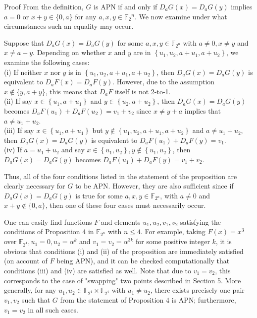 \documentclass[10pt]{article}
\begin{document}
Proof From the definition, $G$ is APN if and only if $D_{a} G(x)=D_{a} G(y)$ implies $a=0$ or $x+y \in\{0, a\}$ for any $a, x, y \in \mathbb{F}_{2}{ }^{n}$. We now examine under what circumstances such an equality may occur.

Suppose that $D_{a} G(x)=D_{a} G(y)$ for some $a, x, y \in \mathbb{F}_{2^{n}}$ with $a \neq 0, x \neq y$ and $x \neq a+y$. Depending on whether $x$ and $y$ are in $\left\{u_{1}, u_{2}, a+u_{1}, a+u_{2}\right\}$, we examine the following cases:\\
(i) If neither $x$ nor $y$ is in $\left\{u_{1}, u_{2}, a+u_{1}, a+u_{2}\right\}$, then $D_{a} G(x)=D_{a} G(y)$ is equivalent to $D_{a} F(x)=D_{a} F(y)$. However, due to the assumption $x \notin\{y, a+y\}$, this means that $D_{a} F$ itself is not 2-to-1.\\
(ii) If say $x \in\left\{u_{1}, a+u_{1}\right\}$ and $y \in\left\{u_{2}, a+u_{2}\right\}$, then $D_{a} G(x)=D_{a} G(y)$ becomes $D_{a} F\left(u_{1}\right)+D_{a} F\left(u_{2}\right)=v_{1}+v_{2}$ since $x \neq y+a$ implies that $a \neq u_{1}+u_{2}$.\\
(iii) If say $x \in\left\{u_{1}, a+u_{1}\right\}$ but $y \notin\left\{u_{1}, u_{2}, a+u_{1}, a+u_{2}\right\}$ and $a \neq u_{1}+u_{2}$, then $D_{a} G(x)=D_{a} G(y)$ is equivalent to $D_{a} F\left(u_{1}\right)+D_{a} F(y)=v_{1}$.\\
(iv) If $a=u_{1}+u_{2}$ and say $x \in\left\{u_{1}, u_{2}\right\}, y \notin\left\{u_{1}, u_{2}\right\}$, then $D_{a} G(x)=D_{a} G(y)$ becomes $D_{a} F\left(u_{1}\right)+D_{a} F(y)=v_{1}+v_{2}$.

Thus, all of the four conditions listed in the statement of the proposition are clearly necessary for $G$ to be APN. However, they are also sufficient since if $D_{a} G(x)=D_{a} G(y)$ is true for some $a, x, y \in \mathbb{F}_{2^{n}}$, with $a \neq 0$ and $x+y \notin\{0, a\}$, then one of these four cases must necessarily occur.

One can easily find functions $F$ and elements $u_{1}, u_{2}, v_{1}, v_{2}$ satisfying the conditions of Proposition 4 in $\mathbb{F}_{2^{n}}$ with $n \leq 4$. For example, taking $F(x)=x^{3}$ over $\mathbb{F}_{2^{4}}, u_{1}=0, u_{2}=\alpha^{k}$ and $v_{1}=v_{2}=\alpha^{3 k}$ for some positive integer $k$, it is obvious that conditions (i) and (ii) of the proposition are immediately satisfied (on account of $F$ being APN), and it can be checked computationally that conditions (iii) and (iv) are satisfied as well. Note that due to $v_{1}=v_{2}$, this corresponds to the case of "swapping" two points described in Section 5. More generally, for any $u_{1}, u_{2} \in \mathbb{F}_{2^{4}} \times \mathbb{F}_{2^{4}}$ with $u_{1} \neq u_{2}$, there exists precisely one pair $v_{1}, v_{2}$ such that $G$ from the statement of Proposition 4 is APN; furthermore, $v_{1}=v_{2}$ in all such cases.
\end{document}
